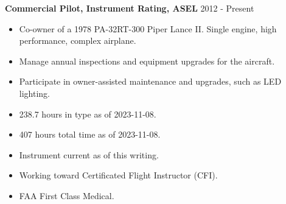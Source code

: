 \textbf{Commercial Pilot, Instrument Rating, ASEL} \hfill 2012 - Present
\begin{itemize} \itemsep -2pt
\item Co-owner of a 1978 PA-32RT-300 Piper Lance II. Single engine, high performance, complex airplane.
\item Manage annual inspections and equipment upgrades for the aircraft.
\item Participate in owner-assisted maintenance and upgrades, such as LED lighting.
\item 238.7 hours in type as of 2023-11-08.
\item 407 hours total time as of 2023-11-08.
\item Instrument current as of this writing.
\item Working toward Certificated Flight Instructor (CFI).
\item FAA First Class Medical.

\end{itemize}
